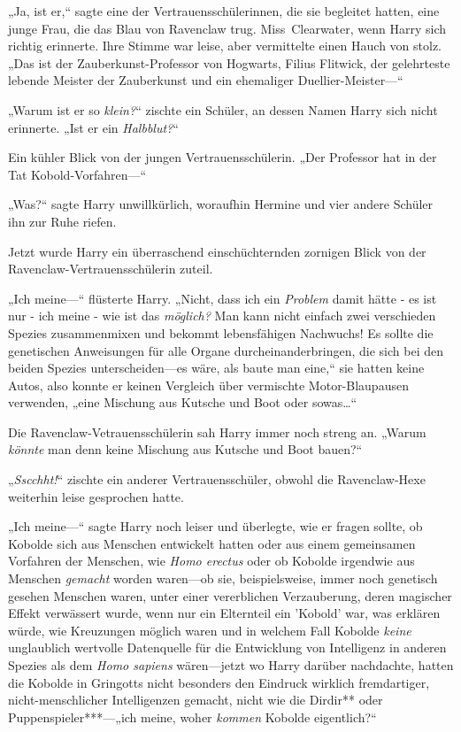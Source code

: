 {„Ja, ist er,“ sagte eine der Vertrauensschülerinnen, die sie begleitet hatten, eine junge Frau, die das Blau von Ravenclaw trug. Miss~Clearwater, wenn Harry sich richtig erinnerte. Ihre Stimme war leise, aber vermittelte einen Hauch von stolz. „Das ist der Zauberkunst-Professor von Hogwarts, Filius Flitwick, der gelehrteste lebende Meister der Zauberkunst und ein ehemaliger Duellier-Meister—“

„Warum ist er so \emph{klein?}“ zischte ein Schüler, an dessen Namen Harry sich nicht erinnerte. „Ist er ein \emph{Halbblut?}“

Ein kühler Blick von der jungen Vertrauensschülerin. „Der Professor hat in der Tat Kobold-Vorfahren—“

„Was?“ sagte Harry unwillkürlich, woraufhin Hermine und vier andere Schüler ihn zur Ruhe riefen.

Jetzt wurde Harry ein überraschend einschüchternden zornigen Blick von der Ravenclaw-Vertrauensschülerin zuteil.

„Ich meine—“ flüsterte Harry. „Nicht, dass ich ein \emph{Problem} damit hätte - es ist nur - ich meine - wie ist das \emph{möglich?} Man kann nicht einfach zwei verschieden Spezies zusammenmixen und bekommt lebensfähigen Nachwuchs! Es sollte die genetischen Anweisungen für alle Organe durcheinanderbringen, die sich bei den beiden Spezies unterscheiden—es wäre, als baute man eine,“ sie hatten keine Autos, also konnte er keinen Vergleich über vermischte Motor-Blaupausen verwenden, „eine Mischung aus Kutsche und Boot oder sowas…“

Die Ravenclaw-Vetrauensschülerin sah Harry immer noch streng an. „Warum \emph{könnte} man denn keine Mischung aus Kutsche und Boot bauen?“

„\emph{Sscchht!}“ zischte ein anderer Vertrauensschüler, obwohl die Ravenclaw-Hexe weiterhin leise gesprochen hatte.

„Ich meine—“ sagte Harry noch leiser und überlegte, wie er fragen sollte, ob Kobolde sich aus Menschen entwickelt hatten oder aus einem gemeinsamen Vorfahren der Menschen, wie \emph{Homo erectus} oder ob Kobolde irgendwie aus Menschen \emph{gemacht} worden waren—ob sie, beispielsweise, immer noch genetisch gesehen Menschen waren, unter einer vererblichen Verzauberung, deren magischer Effekt verwässert wurde, wenn nur ein Elternteil ein 'Kobold' war, was erklären würde, wie Kreuzungen möglich waren und in welchem Fall Kobolde \emph{keine} unglaublich wertvolle Datenquelle für die Entwicklung von Intelligenz in anderen Spezies als dem \emph{Homo sapiens} wären—jetzt wo Harry darüber nachdachte, hatten die Kobolde in Gringotts nicht besonders den Eindruck wirklich fremdartiger, nicht-menschlicher Intelligenzen gemacht, nicht wie die Dirdir** oder Puppenspieler***—„ich meine, woher \emph{kommen} Kobolde eigentlich?“

}
